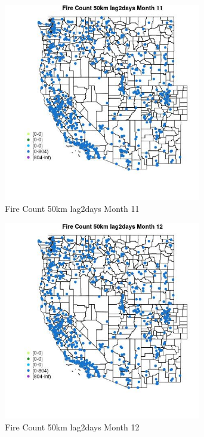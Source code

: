 \begin{figure} 
\centering  
\includegraphics[width=0.77\textwidth]{Code_Outputs/Report_ML_input_PM25_Step4_part_f_de_duplicated_aveswNAs_MapObsMo11Fire_Count_50km_lag2days.jpg} 
\caption{\label{fig:Report_ML_input_PM25_Step4_part_f_de_duplicated_aveswNAsMapObsMo11Fire_Count_50km_lag2days}Fire Count 50km lag2days Month 11} 
\end{figure} 
 

\begin{figure} 
\centering  
\includegraphics[width=0.77\textwidth]{Code_Outputs/Report_ML_input_PM25_Step4_part_f_de_duplicated_aveswNAs_MapObsMo12Fire_Count_50km_lag2days.jpg} 
\caption{\label{fig:Report_ML_input_PM25_Step4_part_f_de_duplicated_aveswNAsMapObsMo12Fire_Count_50km_lag2days}Fire Count 50km lag2days Month 12} 
\end{figure} 
 

